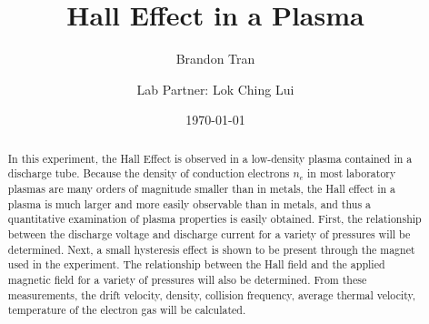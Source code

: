 \documentclass[%
 aip,
rsi,%
 amsmath,amssymb,
 reprint,%
author-numerical,%
]{revtex4-1}
\begin{document}

\title[Physics 111B- Hall Effect in a Plasma (HAL) Lab Report]{Hall Effect in a Plasma}


\author{Brandon Tran}
\author{Lab Partner: Lok Ching Lui}


\date{\today}

\begin{abstract}

In this experiment, the Hall Effect is observed in a low-density plasma contained in a discharge tube. Because the density of conduction electrons $n_{e}$ in most laboratory plasmas are many orders of magnitude smaller than in metals, the Hall effect in a plasma is much larger and more easily observable than in metals,\cite{Kunkel}  and thus a quantitative examination of plasma properties is easily obtained. First, the relationship between the discharge voltage and discharge current for a variety of pressures will be determined. Next, a small hysteresis effect is shown to be present through the magnet used in the experiment. The relationship between the Hall field and the applied magnetic field for a variety of pressures will also be determined. From these measurements, the drift velocity, density, collision frequency, average thermal velocity, temperature of the electron gas will be calculated. 

\end{abstract} 


\maketitle
\end{document}
